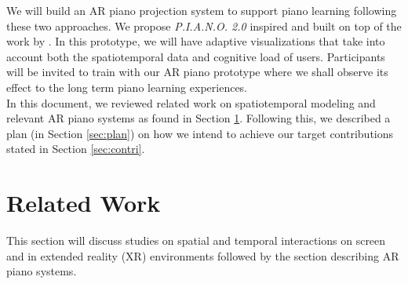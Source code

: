 \documentclass[manuscript,screen]{acmart}
\begin{document}

We will build an AR piano projection system to support piano learning following these two approaches. We propose \textit{P.I.A.N.O. 2.0} inspired and built on top of the work by \citet{rogers2014piano}. In this prototype, we will have adaptive visualizations that take into account both the spatiotemporal data and cognitive load of users. Participants will be invited to train with our AR piano prototype where we shall observe its effect to the long term piano learning experiences.\\

In this document, we reviewed related work on spatiotemporal modeling and relevant AR piano systems as found in Section \ref{sec:rrl}. Following this, we described a plan (in Section \ref{sec:plan}) on how we intend to achieve our target contributions stated in Section \ref{sec:contri}. \\



\section{Related Work}
\label{sec:rrl}
This section will discuss studies on spatial and temporal interactions on screen and in extended reality (XR) environments followed by the section describing AR piano systems. 
\end{document}
